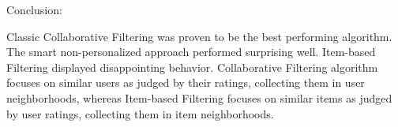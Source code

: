 \documentclass{tcc}
\begin{document}
\begin{flushleft}
\Large{{\selectfont
Conclusion:
}}
\end{flushleft}
Classic Collaborative Filtering was proven to be the best performing algorithm. The smart non-personalized approach performed surprising well. Item-based Filtering displayed disappointing behavior. Collaborative Filtering algorithm focuses on similar users as judged by their ratings, collecting them in user neighborhoods, whereas Item-based Filtering focuses on similar items as judged by user ratings, collecting them in item neighborhoods.
\end{document}
